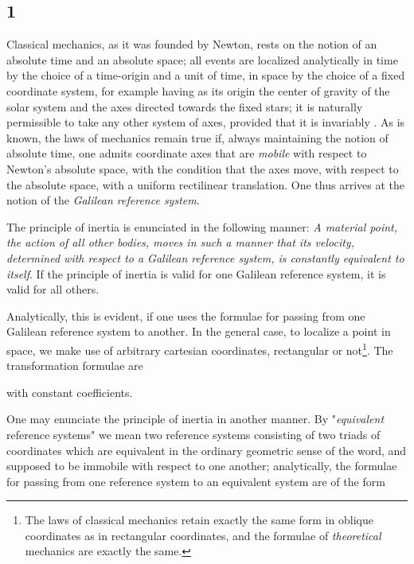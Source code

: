 \subsection*{1}
Classical mechanics, as it was founded by Newton, rests on the notion of an absolute time and an absolute space; all events are localized analytically in time by the choice of a time-origin and a unit of time, in space by the choice of a fixed coordinate system, for example having as its origin the center of gravity of the solar system and the axes directed towards the fixed stars; it is naturally permissible to take any other system of axes, provided that it is invariably . As is known, the laws of mechanics remain true if, always maintaining the notion of absolute time, one admits coordinate axes that are \textit{mobile} with respect to Newton's absolute space, with the condition that the axes move, with respect to the absolute space, with a uniform rectilinear translation. One thus arrives at the notion of the \textit{Galilean reference system}.

The principle of inertia is enunciated in the following manner: \textit{A material point,  the action of all other bodies, moves in such a manner that its velocity, determined with respect to a Galilean reference system, is constantly equivalent to itself}. If the principle of inertia is valid for one Galilean reference system, it is valid for all others.

Analytically, this is evident, if one uses the formulae for passing from one Galilean reference system to another. In the general case, to localize a point in space, we make use of arbitrary cartesian coordinates, rectangular or not\footnote{The laws of classical mechanics retain exactly the same form in oblique coordinates as in rectangular coordinates, and the formulae of \textit{theoretical} mechanics are exactly the same.}. The transformation formulae are

with constant coefficients.

One may enunciate the principle of inertia in another manner. By "\textit{equivalent} reference  systems" we mean two reference systems consisting of two triads of coordinates which are equivalent in the ordinary geometric sense of the word, and supposed to be immobile with respect to one another; analytically, the formulae for passing from one reference system to an equivalent system are of the form

